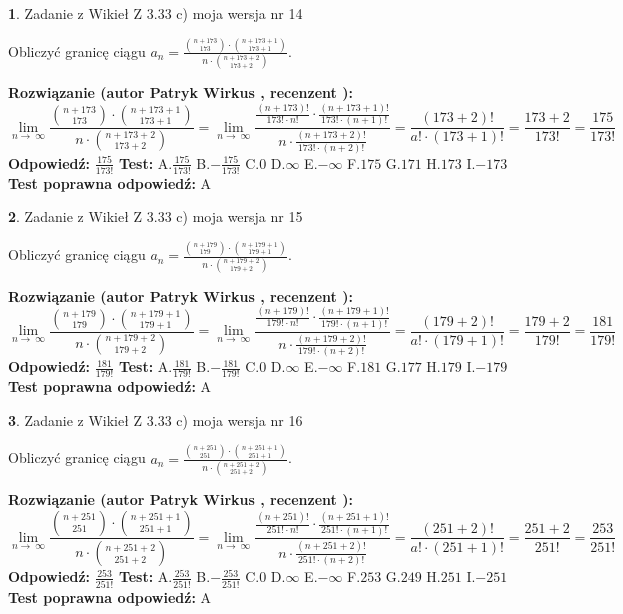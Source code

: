 \documentclass[12pt, a4paper]{article}
\theoremstyle{definition} %
\newtheorem{zad}{}
\newcommand{\zadStart}[1]{\begin{zad}#1\newline}
\newcommand{\zadStop}{\end{zad}}
\newcommand{\rozwStart}[2]{\noindent \textbf{Rozwiązanie (autor #1 , recenzent #2): }\newline}
\newcommand{\rozwStop}{\newline}
\newcommand{\odpStart}{\noindent \textbf{Odpowiedź:}\newline}
\newcommand{\odpStop}{\newline}
\newcommand{\testStart}{\noindent \textbf{Test:}\newline}
\newcommand{\testStop}{\newline}
\newcommand{\kluczStart}{\noindent \textbf{Test poprawna odpowiedź:}\newline}
\newcommand{\kluczStop}{\newline}
\begin{document}
\zadStart{Zadanie z Wikieł Z 3.33 c) moja wersja nr 14}

Obliczyć granicę ciągu $a_{n}=\frac{{n+173\choose173}\cdot{n+173+1\choose173+1}}{n\cdot{n+173+2\choose173+2}}$.
\zadStop
\rozwStart{Patryk Wirkus}{}
$$\lim\limits_{n\to\ \infty}\frac{{n+173\choose173}\cdot{n+173+1\choose173+1}}{n\cdot{n+173+2\choose173+2}} = \lim\limits_{n\to\ \infty}\frac{\frac{(n+173)!}{173! \cdot n!}\cdot \frac{(n+173+1)!}{173! \cdot (n+1)!}}{n\cdot \frac{(n+173+2)!}{173! \cdot (n+2)!}} = \frac{(173+2)!}{a!\cdot (173+1)!} = \frac{173+2}{173!} = \frac{175}{173!}$$
\rozwStop
\odpStart
$\frac{175}{173!}$
\odpStop
\testStart
A.$\frac{175}{173!}$ B.$-\frac{175}{173!}$ C.$0$ D.$\infty$ E.$-\infty$
F.$175$ G.$171$
H.$173$
I.$-173$
\testStop
\kluczStart
A
\kluczStop



\zadStart{Zadanie z Wikieł Z 3.33 c) moja wersja nr 15}

Obliczyć granicę ciągu $a_{n}=\frac{{n+179\choose179}\cdot{n+179+1\choose179+1}}{n\cdot{n+179+2\choose179+2}}$.
\zadStop
\rozwStart{Patryk Wirkus}{}
$$\lim\limits_{n\to\ \infty}\frac{{n+179\choose179}\cdot{n+179+1\choose179+1}}{n\cdot{n+179+2\choose179+2}} = \lim\limits_{n\to\ \infty}\frac{\frac{(n+179)!}{179! \cdot n!}\cdot \frac{(n+179+1)!}{179! \cdot (n+1)!}}{n\cdot \frac{(n+179+2)!}{179! \cdot (n+2)!}} = \frac{(179+2)!}{a!\cdot (179+1)!} = \frac{179+2}{179!} = \frac{181}{179!}$$
\rozwStop
\odpStart
$\frac{181}{179!}$
\odpStop
\testStart
A.$\frac{181}{179!}$ B.$-\frac{181}{179!}$ C.$0$ D.$\infty$ E.$-\infty$
F.$181$ G.$177$
H.$179$
I.$-179$
\testStop
\kluczStart
A
\kluczStop



\zadStart{Zadanie z Wikieł Z 3.33 c) moja wersja nr 16}

Obliczyć granicę ciągu $a_{n}=\frac{{n+251\choose251}\cdot{n+251+1\choose251+1}}{n\cdot{n+251+2\choose251+2}}$.
\zadStop
\rozwStart{Patryk Wirkus}{}
$$\lim\limits_{n\to\ \infty}\frac{{n+251\choose251}\cdot{n+251+1\choose251+1}}{n\cdot{n+251+2\choose251+2}} = \lim\limits_{n\to\ \infty}\frac{\frac{(n+251)!}{251! \cdot n!}\cdot \frac{(n+251+1)!}{251! \cdot (n+1)!}}{n\cdot \frac{(n+251+2)!}{251! \cdot (n+2)!}} = \frac{(251+2)!}{a!\cdot (251+1)!} = \frac{251+2}{251!} = \frac{253}{251!}$$
\rozwStop
\odpStart
$\frac{253}{251!}$
\odpStop
\testStart
A.$\frac{253}{251!}$ B.$-\frac{253}{251!}$ C.$0$ D.$\infty$ E.$-\infty$
F.$253$ G.$249$
H.$251$
I.$-251$
\testStop
\kluczStart
A
\kluczStop
\end{document}
